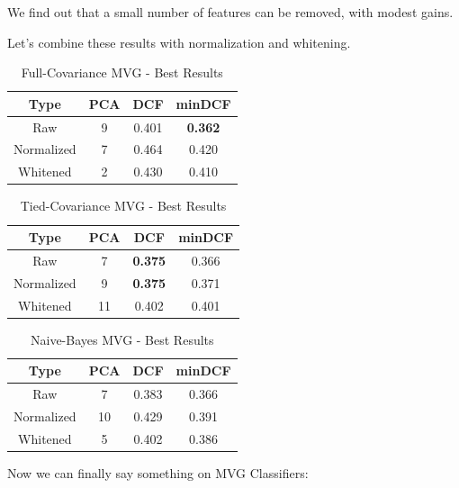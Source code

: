 \documentclass[twocolumn]{article}
\begin{document}
We find out that a small number of features can be removed, with modest gains.

Let's combine these results with normalization and whitening.

\begin{table}[H]
    \centering
        \begin{tabular}{||c|c|c|c||}
            \hline
            Type & PCA & DCF & minDCF \\
            \hline
            \hline
            Raw & 9 & 0.401 & {\bf 0.362}  \\
            Normalized &  7 & 0.464 & 0.420 \\
            Whitened & 2 & 0.430 & 0.410 \\
            \hline
    \end{tabular}
    \caption{Full-Covariance MVG - Best Results}
\end{table}

\begin{table}[H]
    \centering
        \begin{tabular}{||c|c|c|c||}
            \hline
            Type & PCA & DCF & minDCF \\
            \hline
            \hline
            Raw & 7 & {\bf 0.375} & 0.366  \\
            Normalized &  9 & {\bf 0.375} & 0.371 \\
            Whitened & 11 & 0.402 & 0.401 \\
            \hline
    \end{tabular}
    \caption{Tied-Covariance MVG - Best Results}
\end{table}

\begin{table}[H]
    \centering
        \begin{tabular}{||c|c|c|c||}
            \hline
            Type & PCA & DCF & minDCF \\
            \hline
            \hline
            Raw & 7 & 0.383 & 0.366  \\
            Normalized &  10 & 0.429 & 0.391 \\
            Whitened & 5 & 0.402 & 0.386 \\
            \hline
    \end{tabular}
    \caption{Naive-Bayes MVG - Best Results}
\end{table}

Now we can finally say something on MVG Classifiers:
\end{document}
